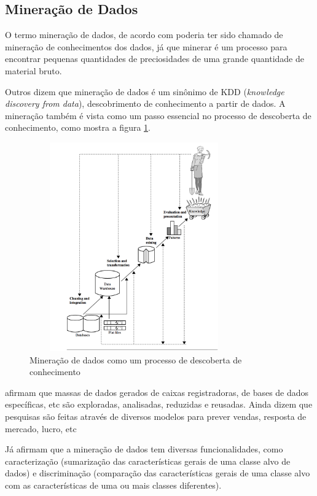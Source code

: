 \subsection{Mineração de Dados}

O termo mineração de dados, de acordo com  poderia ter sido chamado de mineração de conhecimentos dos dados, já que minerar é um processo para encontrar pequenas quantidades de preciosidades de uma grande quantidade de material bruto. 

Outros dizem que mineração de dados é um sinônimo de KDD (\textit{knowledge discovery from data}), descobrimento de conhecimento a partir de dados. A mineração também é vista como um passo essencial no processo de descoberta de conhecimento, como mostra a figura \ref{kdd}. 


\begin{figure}[H]
\centering
\includegraphics[height=9cm, width=9cm]{imagens/kdd.png}
\caption{Mineração de dados como um processo de descoberta de conhecimento \citep{jmj}}
\label{kdd}
\end{figure}

 afirmam que massas de dados gerados de caixas registradoras, de bases de dados específicas, etc são exploradas, analisadas, reduzidas e reusadas. Ainda dizem que pesquisas são feitas através de diversos modelos para prever vendas, resposta de mercado, lucro, etc

Já  afirmam que a mineração de dados tem diversas funcionalidades, como caracterização (sumarização das características gerais de uma classe alvo de dados) e discriminação (comparação das características gerais de uma classe alvo com as características de uma ou mais classes diferentes). 

